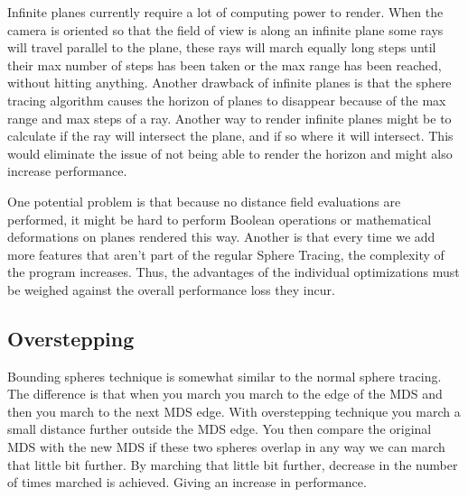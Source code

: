 			Infinite planes currently require a lot of computing power to
			render. When the camera is oriented so that the field of view is
			along an infinite plane some rays will travel parallel to the
			plane, these rays will march equally long steps until their max
			number of steps has been taken or the max range has been reached,
			without hitting anything. Another drawback of infinite planes is
			that the sphere tracing algorithm causes the horizon of planes to
			disappear because of the max range and max steps of a ray. Another
			way to render infinite planes might be to calculate if the ray will
			intersect the plane, and if so where it will intersect. This would
			eliminate the issue of not being able to render the horizon and
			might also increase performance.

			One potential problem is that because no distance field evaluations 
			are performed, it might be hard to perform Boolean operations or 
			mathematical deformations on planes rendered this way. Another is 
			that every time we add more features that aren't part of the regular 
			Sphere Tracing, the complexity of the program increases. Thus, the 
			advantages of the individual optimizations must be weighed against 
			the overall performance loss they incur. 

		\subsection{Overstepping}

			Bounding spheres technique is somewhat similar to the normal sphere
			tracing. The difference is that when you march you march to the
			edge of the MDS and then you march to the next MDS edge. With
			overstepping technique you march a small distance further
			outside the MDS edge. You then compare the original MDS with the
			new MDS if these two spheres overlap in any way we can march that
			little bit further. By marching that little bit further, decrease
			in the number of times marched is achieved. Giving an increase in
			performance. 
			
